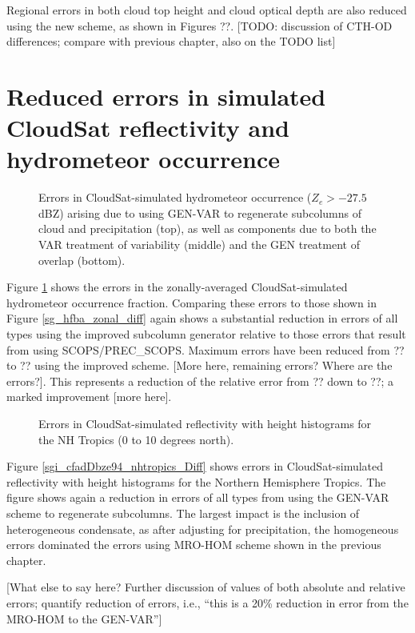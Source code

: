 Regional errors in both cloud top height and cloud optical depth are also reduced using the new scheme, as shown in Figures ??. [TODO: discussion of CTH-OD differences; compare with previous chapter, also on the TODO list]


\section{Reduced errors in simulated CloudSat reflectivity and hydrometeor occurrence}
\begin{figure}
\centering
\caption{Errors in CloudSat-simulated hydrometeor occurrence ($Z_e > -27.5$ dBZ) arising due to using GEN-VAR to regenerate subcolumns of cloud and precipitation (top), as well as components due to both the VAR treatment of variability (middle) and the GEN treatment of overlap (bottom).}
\label{sgi_hfba_zonal_diff}
\end{figure}
Figure \ref{sgi_hfba_zonal_diff} shows the errors in the zonally-averaged CloudSat-simulated hydrometeor occurrence fraction. Comparing these errors to those shown in Figure \ref{sg_hfba_zonal_diff} again shows a substantial reduction in errors of all types using the improved subcolumn generator relative to those errors that result from using SCOPS/PREC\_SCOPS. Maximum errors have been reduced from ?? to ?? using the improved scheme. [More here, remaining errors? Where are the errors?]. This represents a reduction of the relative error from ?? down to ??; a marked improvement [more here].

\begin{figure}
\centering
\caption{Errors in CloudSat-simulated reflectivity with height histograms for the NH Tropics (0 to 10 degrees north).}
\label{sgi_cfadDbze94_nhtropics_diff}
\end{figure}
Figure \ref{sgi_cfadDbze94_nhtropics_Diff} shows errors in CloudSat-simulated reflectivity with height histograms for the Northern Hemisphere Tropics. The figure shows again a reduction in errors of all types from using the GEN-VAR scheme to regenerate subcolumns. The largest impact is the inclusion of heterogeneous condensate, as after adjusting for precipitation, the homogeneous errors dominated the errors using MRO-HOM scheme shown in the previous chapter. 

[What else to say here? Further discussion of values of both absolute and relative errors; quantify reduction of errors, i.e., ``this is a 20\% reduction in error from the MRO-HOM to the GEN-VAR'']

